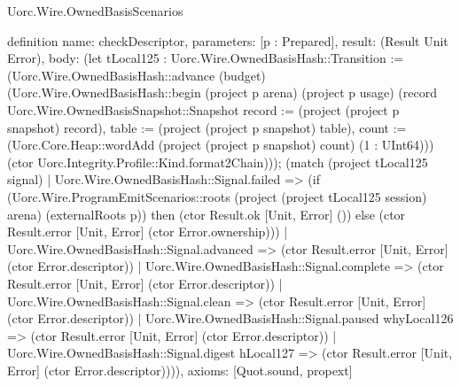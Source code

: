\begin{lexlean}{Uorc.Wire.OwnedBasisScenarios}
\begin{semanticmodule}
definition{
  name: checkDescriptor,
  parameters: [p : Prepared],
  result: (Result Unit Error),
  body: (let tLocal125 : Uorc.Wire.OwnedBasisHash::Transition := (Uorc.Wire.OwnedBasisHash::advance (budget) (Uorc.Wire.OwnedBasisHash::begin (project p arena) (project p usage) (record Uorc.Wire.OwnedBasisSnapshot::Snapshot {record := (project (project p snapshot) record), table := (project (project p snapshot) table), count := (Uorc.Core.Heap::wordAdd (project (project p snapshot) count) (1 : UInt64))}) (ctor Uorc.Integrity.Profile::Kind.format2Chain))); (match (project tLocal125 signal)
    | Uorc.Wire.OwnedBasisHash::Signal.failed => (if (Uorc.Wire.ProgramEmitScenarios::roots (project (project tLocal125 session) arena) (externalRoots p)) then (ctor Result.ok [Unit, Error] ()) else (ctor Result.error [Unit, Error] (ctor Error.ownership)))
    | Uorc.Wire.OwnedBasisHash::Signal.advanced => (ctor Result.error [Unit, Error] (ctor Error.descriptor))
    | Uorc.Wire.OwnedBasisHash::Signal.complete => (ctor Result.error [Unit, Error] (ctor Error.descriptor))
    | Uorc.Wire.OwnedBasisHash::Signal.clean => (ctor Result.error [Unit, Error] (ctor Error.descriptor))
    | Uorc.Wire.OwnedBasisHash::Signal.paused whyLocal126 => (ctor Result.error [Unit, Error] (ctor Error.descriptor))
    | Uorc.Wire.OwnedBasisHash::Signal.digest hLocal127 => (ctor Result.error [Unit, Error] (ctor Error.descriptor)))),
  axioms: [Quot.sound, propext]
}


\end{semanticmodule}
\end{lexlean}
